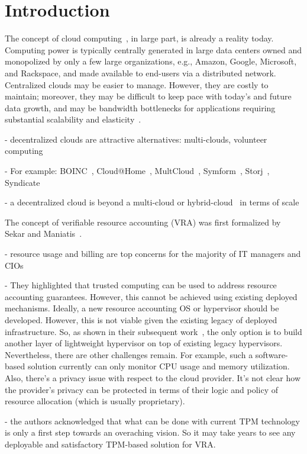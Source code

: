 \section{Introduction} \label{sect:intro}

The concept of cloud computing~\cite{AFG+10}, in large part, is already a reality today.
Computing power is typically centrally generated in large data centers owned and monopolized by only a few large organizations, e.g., Amazon, Google, Microsoft, and Rackspace, and made available to end-users via a distributed network.
Centralized clouds may be easier to manage.
However, they are costly to maintain; moreover, they may be difficult to keep pace with today's and future data growth, and may be bandwidth bottlenecks for applications requiring substantial scalability and elasticity~\cite{symform-slide,techrepublic}.


- decentralized clouds are attractive alternatives: multi-clouds, volunteer computing

- For example: BOINC~\cite{BOINC}, Cloud@Home~\cite{DP12}, MultCloud~\cite{MultCloud}, Symform~\cite{Symform}, Storj~\cite{Storj}, Syndicate~\cite{Syndicate}

- a decentralized cloud is beyond a multi-cloud or hybrid-cloud~\cite{ZHA+12,EK13} in terms of scale

The concept of verifiable resource accounting (VRA) was first formalized by Sekar and Maniatis~\cite{SM11}.

- resource usage and billing are top concerns for the majority of IT managers and CIOs 

- They highlighted that trusted computing can be used to address resource accounting guarantees. However, this cannot be achieved using existing deployed mechanisms. Ideally, a new resource accounting OS or hypervisor should be developed. However, this is not viable given the existing legacy of deployed infrastructure. So, as shown in their subsequent work~\cite{CMP+13}, the only option is to build another layer of lightweight hypervisor on top of existing legacy hypervisors. Nevertheless, there are other challenges remain. For example, such a software-based solution currently can only monitor CPU usage and memory utilization. Also, there's a privacy issue with respect to the cloud provider. It's not clear how the provider's privacy can be protected in terms of their logic and policy of resource allocation (which is usually proprietary).

- the authors acknowledged that what can be done with current TPM technology is only a first step towards an overaching vision. So it may take years to see any deployable and satisfactory TPM-based solution for VRA.


